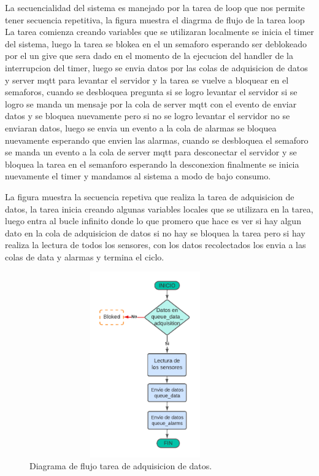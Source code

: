 La secuencialidad del sistema es manejado por la tarea de loop que nos permite tener secuencia repetitiva, la figura muestra el diagrma de flujo de la tarea loop 
La tarea comienza creando variables que se utilizaran localmente se inicia el timer del sistema, luego la tarea se blokea en el un semaforo esperando ser deblokeado por el un give que sera dado en el momento de la ejecucion del handler de la interrupcion del timer, luego se envia datos por las colas de adquisicion de datos y server mqtt para levantar el servidor y la tarea se vuelve a bloquear en el semaforos, cuando se desbloquea pregunta si se logro levantar el servidor si se logro se manda un mensaje por la cola de server mqtt con el evento de enviar datos y se bloquea nuevamente pero si no se logro levantar el servidor no se enviaran datos, luego se envia un evento a la cola de alarmas se bloquea nuevamente esperando que envien las alarmas, cuando se desbloquea el semaforo se manda un evento a la cola de server mqtt para desconectar el servidor y se bloquea la tarea en el semanforo esperando la desconexion  finalmente se inicia nuevamente el timer y mandamos al sistema a modo de bajo consumo. 


La figura muestra la secuencia repetiva que realiza la tarea de adquisicion de datos, la tarea inicia creando algunas variables locales que se utilizara en la tarea, luego entra al bucle infinito donde lo que promero que hace es ver si hay algun dato en la cola de adquisicion de datos si no hay se bloquea la tarea pero si hay realiza la lectura de todos los sensores, con los datos recolectados los envia a las colas de data y alarmas y termina el ciclo.
\begin{figure}[htbp]
  \centering
	\includegraphics[width=10cm, height=8cm]{./Figures/DF task adquisicion.png}
	\caption{Diagrama de flujo tarea de adquisicion de datos.}
	\label{fig:Df tarea adquisicion}
\end{figure}

